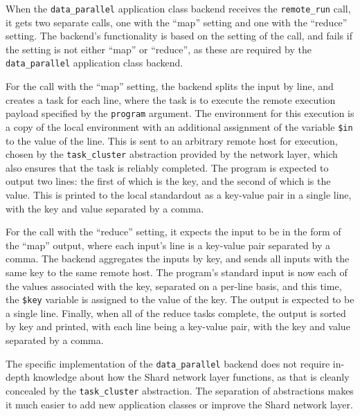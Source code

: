 \documentclass[twoside]{report}
\begin{document}
When the \texttt{data\_parallel} application class backend receives the \texttt{remote\_run} call, it gets two separate calls, one with the ``map'' setting and one with the ``reduce'' setting.
The backend's functionality is based on the setting of the call, and fails if the setting is not either ``map'' or ``reduce'', as these are required by the \texttt{data\_parallel} application class backend.

For the call with the ``map'' setting, the backend splits the input by line, and creates a task for each line, where the task is to execute the remote execution payload specified by the \texttt{program} argument.
The environment for this execution is a copy of the local environment with an additional assignment of the variable \texttt{\$in} to the value of the line.
This is sent to an arbitrary remote host for execution, chosen by the \texttt{task\_cluster} abstraction provided by the network layer, which also ensures that the task is reliably completed.
The program is expected to output two lines: the first of which is the key, and the second of which is the value.
This is printed to the local standardout as a key-value pair in a single line, with the key and value separated by a comma.

For the call with the ``reduce'' setting, it expects the input to be in the form of the ``map'' output, where each input's line is a key-value pair separated by a comma.
The backend aggregates the inputs by key, and sends all inputs with the same key to the same remote host.
The program's standard input is now each of the values associated with the key, separated on a per-line basis, and this time, the \texttt{\$key} variable is assigned to the value of the key.
The output is expected to be a single line.
Finally, when all of the reduce tasks complete, the output is sorted by key and printed, with each line being a key-value pair, with the key and value separated by a comma.

\begin{sloppypar}
  The specific implementation of the \texttt{data\_parallel} backend does not require in-depth knowledge about how the Shard network layer functions, as that is cleanly concealed by the \texttt{task\_cluster} abstraction.
  The separation of abstractions makes it much easier to add new application classes or improve the Shard network layer.
\end{sloppypar}
\end{document}
